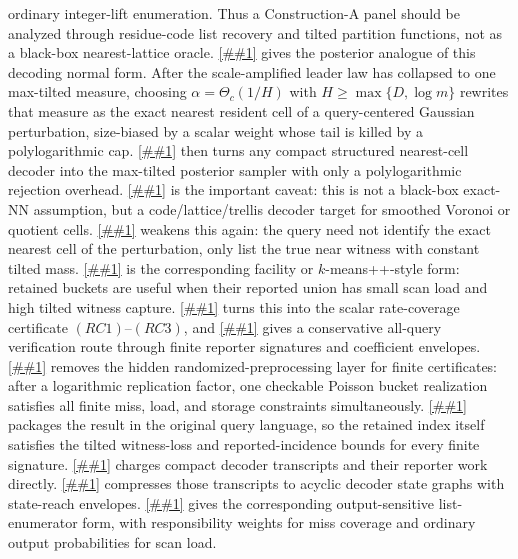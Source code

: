 \documentclass[10pt]{article}
\newcommand{\cref}[1]{\ref{##1}}
\newcommand{\Cref}[1]{\ref{##1}}
\theoremstyle{definition}
\begin{document}
ordinary integer-lift enumeration.  Thus a Construction-A panel should be
analyzed through residue-code list recovery and tilted partition functions, not
as a black-box nearest-lattice oracle.
\Cref{cor:query-centered-cell-reweighting} gives the posterior analogue of
this decoding normal form.  After the scale-amplified leader law has collapsed
to one max-tilted measure, choosing
\(\alpha=\Theta_c(1/H)\) with \(H\ge\max\{D,\log m\}\) rewrites that measure as
the exact nearest resident cell of a query-centered Gaussian perturbation,
size-biased by a scalar weight whose tail is killed by a polylogarithmic cap.
\Cref{cor:truncated-nearest-cell-compiler} then turns any compact structured
nearest-cell decoder into the max-tilted posterior sampler with only a
polylogarithmic rejection overhead.  \Cref{rem:nearest-cell-structured-decoding}
is the important caveat: this is not a black-box exact-NN assumption, but a
code/lattice/trellis decoder target for smoothed Voronoi or quotient cells.
\Cref{lem:smoothed-witness-list-compiler} weakens this again: the query need
not identify the exact nearest cell of the perturbation, only list the true near
witness with constant tilted mass.  \Cref{cor:facility-bucket-witness} is the
corresponding facility or \(k\)-means++-style form: retained buckets are useful
when their reported union has small scan load and high tilted witness capture.
\Cref{lem:poisson-rate-coverage} turns this into the scalar rate-coverage
certificate \((RC1)\)--\((RC3)\), and
\cref{lem:finite-signature-rate-coverage} gives a conservative all-query
verification route through finite reporter signatures and coefficient
envelopes.
\Cref{lem:finite-poisson-rate-coverage-realization} removes the hidden
randomized-preprocessing layer for finite certificates: after a logarithmic
replication factor, one checkable Poisson bucket realization satisfies all
finite miss, load, and storage constraints simultaneously.
\Cref{cor:finite-signature-retained-buckets} packages the result in the
original query language, so the retained index itself satisfies the tilted
witness-loss and reported-incidence bounds for every finite signature.
\Cref{cor:finite-transcript-rate-coverage} charges compact
decoder transcripts and their reporter work directly.
\Cref{cor:compressed-decoder-dag-rate-coverage} compresses those transcripts to
acyclic decoder state graphs with state-reach envelopes.
\Cref{cor:output-sensitive-decoder-dag-rate-coverage} gives the corresponding
output-sensitive list-enumerator form, with responsibility weights for miss
coverage and ordinary output probabilities for scan load.
\end{document}
